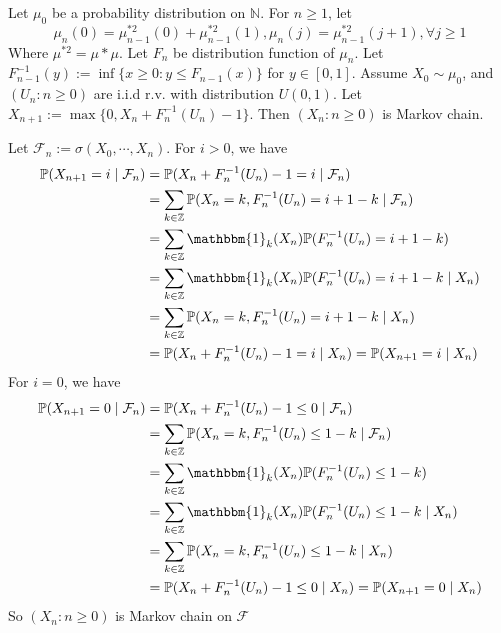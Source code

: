 \documentclass{ctexart}
\begin{document}
\begin{problem}\label{pro:6}
  Let \(\mu_0\) be a probability distribution on \(\mathbb{N}\).
  For \(n \geq 1\), let
  \[
    \mu_n(0)=\mu^{*2}_{n-1} (0)+\mu^{*2}_{n-1} (1),\mu_n(j)=\mu^{*2}_{n-1} (j+1),\forall j \geq 1
  \]
  Where \(\mu^{*2}=\mu*\mu\).
  Let \(F_n\) be distribution function of \(\mu_n\).
  Let \(F^{-1}_{n-1} (y):=\inf \{x \geq 0:y \leq F_{n-1} (x)\}\) for \(y \in [0,1]\).
  Assume \(X_0 \sim \mu_0\), and \((U_n:n \geq 0)\) are i.i.d r.v. with distribution \(U(0,1)\).
  Let \(X_{n+1} :=\max\{0,X_n +F^{-1}_n (U_n)-1\}\).
  Then \((X_n:n \geq 0)\) is Markov chain.
\end{problem}
\begin{solution}
  Let \(\mathcal{F}_n:=\sigma(X_0,\cdots,X_n)\).
  For \(i > 0\), we have
  \[
    \begin{aligned}
      \mathbb{P}(X_{n+1}=i \mid \mathcal{F}_n)
       & =\mathbb{P}(X_n+F^{-1}_n(U_n)-1=i \mid \mathcal{F}_n)                              \\
       & =\sum_{k \in \mathbb{Z}}\mathbb{P}(X_n=k,F^{-1}_n(U_n)=i+1-k \mid \mathcal{F}_n)   \\
       & =\sum_{k \in \mathbb{Z}}\mathbbm{1}_k(X_n)\mathbb{P}(F^{-1}_n(U_n)=i+1-k)          \\
       & =\sum_{k \in \mathbb{Z}}\mathbbm{1}_k(X_n)\mathbb{P}(F^{-1}_n(U_n)=i+1-k \mid X_n) \\
       & =\sum_{k \in \mathbb{Z}}\mathbb{P}(X_n=k,F^{-1}_n(U_n)=i+1-k \mid X_n)             \\
       & =\mathbb{P}(X_n+F^{-1}_n(U_n)-1=i \mid X_n) =\mathbb{P}(X_{n+1} =i \mid X_n)
    \end{aligned}
  \]
  For \(i=0\), we have
  \[
    \begin{aligned}
      \mathbb{P}(X_{n+1}=0 \mid \mathcal{F}_n)
       & =\mathbb{P}(X_n+F^{-1}_n(U_n)-1\leq 0 \mid \mathcal{F}_n)                            \\
       & =\sum_{k \in \mathbb{Z}}\mathbb{P}(X_n=k,F^{-1}_n(U_n)\leq 1-k \mid \mathcal{F}_n)   \\
       & =\sum_{k \in \mathbb{Z}}\mathbbm{1}_k(X_n)\mathbb{P}(F^{-1}_n(U_n)\leq 1-k)          \\
       & =\sum_{k \in \mathbb{Z}}\mathbbm{1}_k(X_n)\mathbb{P}(F^{-1}_n(U_n)\leq 1-k \mid X_n) \\
       & =\sum_{k \in \mathbb{Z}}\mathbb{P}(X_n=k,F^{-1}_n(U_n)\leq 1-k \mid X_n)             \\
       & =\mathbb{P}(X_n+F^{-1}_n(U_n)-1\leq 0 \mid X_n) =\mathbb{P}(X_{n+1} = 0 \mid X_n)
    \end{aligned}
  \]
  So \((X_n:n \geq 0)\) is Markov chain on \(\mathscr{F}\)
\end{solution}
\end{document}
